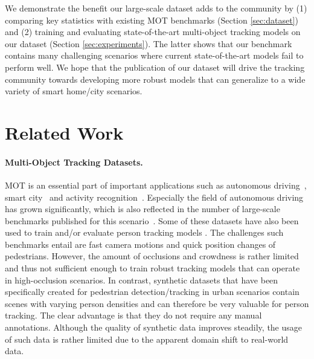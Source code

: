 \documentclass[runningheads]{llncs}
\begin{document}
We demonstrate the benefit our large-scale dataset adds to the community by (1) comparing key statistics with existing MOT benchmarks (Section \ref{sec:dataset}) and (2) training and evaluating state-of-the-art multi-object tracking models on our dataset (Section \ref{sec:experiments}). The latter shows that our benchmark contains many challenging scenarios where current state-of-the-art models fail to perform well. 
We hope that the publication of our dataset will drive the tracking community towards developing more robust models that can generalize to a wide variety of smart home/city scenarios.


 
\section{Related Work}


\paragraph{\textbf{Multi-Object Tracking Datasets.}}
MOT is an essential part of important applications such as autonomous driving~\cite{ess2010object,rangesh2019no,rezaei2021traffic}, smart city~\cite{datta2002person,mathur2018intelligent,chandrajit2016multiple,chandrakar2022enhanced} and activity recognition~\cite{wu2007scalable,beddiar2020vision}. Especially the field of autonomous driving has grown significantly, which is also reflected in the number of large-scale benchmarks published for this scenario~\cite{kitti,cityscapes,lyft,waymo,nuscenes,argoverse,crp,yu2020bdd100k}. Some of these datasets have also been used to train and/or evaluate person tracking models \cite{quasidense,siammot}.
The challenges such benchmarks entail are fast camera motions and quick position changes of pedestrians. However, the amount of occlusions and crowdness is rather limited and thus not sufficient enough to train robust tracking models that can operate in high-occlusion scenarios.
In contrast, synthetic datasets that have been specifically created for pedestrian detection/tracking in urban scenarios \cite{motsynth,jta} contain scenes with varying person densities and can therefore be very valuable for person tracking. The clear advantage is that they do not require any manual annotations. Although the quality of synthetic data improves steadily, the usage of such data is rather limited due to the apparent domain shift to real-world data.
\end{document}
